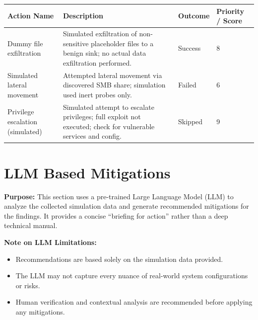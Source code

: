 \documentclass[a4paper,12pt]{article}
\begin{document}
\begin{longtable}{|p{4cm}|p{6cm}|p{2cm}|p{2cm}|}
\hline
\textbf{Action Name} & \textbf{Description} & \textbf{Outcome} & \textbf{Priority / Score} \\
\hline

    
Dummy file exfiltration & Simulated exfiltration of non-sensitive placeholder files to a benign sink; no actual data exfiltration performed. & Success & 8 \\
\hline
    
Simulated lateral movement & Attempted lateral movement via discovered SMB share; simulation used inert probes only. & Failed & 6 \\
\hline
    
Privilege escalation (simulated) & Simulated attempt to escalate privileges; full exploit not executed; check for vulnerable services and config. & Skipped & 9 \\
\hline
    

\end{longtable}

\newpage


\section*{LLM Based Mitigations}

\textbf{Purpose:} This section uses a pre-trained Large Language Model (LLM) to analyze the collected simulation data and generate recommended mitigations for the findings. It provides a concise “briefing for action” rather than a deep technical manual.

\vspace{0.3cm}
\textbf{Note on LLM Limitations:}  
\begin{itemize}
    \item Recommendations are based solely on the simulation data provided.
    \item The LLM may not capture every nuance of real-world system configurations or risks.
    \item Human verification and contextual analysis are recommended before applying any mitigations.
\end{itemize}
\end{document}
